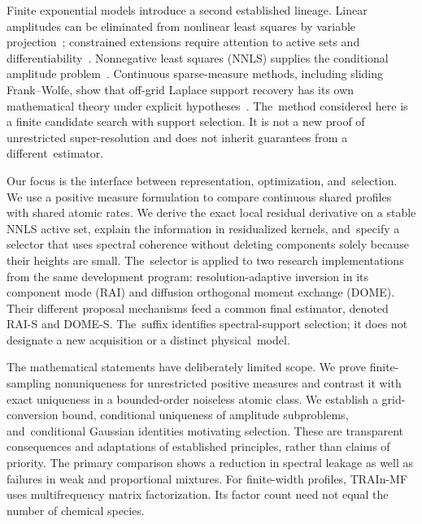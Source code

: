 \documentclass[mathematics,article,accept,moreauthors]{Definitions/mdpi}
\begin{document}
Finite exponential models introduce a second established lineage. Linear amplitudes can be eliminated from nonlinear least squares by variable projection~\cite{golub}; constrained extensions require attention to active sets and differentiability~\cite{shearer}. Nonnegative least squares (NNLS) supplies the conditional amplitude problem~\cite{lawson}. Continuous sparse-measure methods, including sliding Frank--Wolfe, show that off-grid Laplace support recovery has its own mathematical theory under explicit hypotheses~\cite{denoyelle}. The~method considered here is a finite candidate search with support selection. It is not a new proof of unrestricted super-resolution and does not inherit guarantees from a different~estimator.

Our focus is the interface between representation, optimization, and~selection. We use a positive measure formulation to compare continuous shared profiles with shared atomic rates. We derive the exact local residual derivative on a stable NNLS active set, explain the information in residualized kernels, and~specify a selector that uses spectral coherence without deleting components solely because their heights are small. The~selector is applied to two research implementations from the same development program: resolution-adaptive inversion in its component mode (RAI) and diffusion orthogonal moment exchange (DOME). Their different proposal mechanisms feed a common final estimator, denoted RAI-S and DOME-S. The~suffix identifies spectral-support selection; it does not designate a new acquisition or a distinct physical~model.

The mathematical statements have deliberately limited scope. We prove finite-sampling nonuniqueness for unrestricted positive measures and contrast it with exact uniqueness in a bounded-order noiseless atomic class. We establish a grid-conversion bound, conditional uniqueness of amplitude subproblems, and~conditional Gaussian identities motivating selection. These are transparent consequences and adaptations of established principles, rather than claims of priority. The primary comparison shows a reduction in spectral leakage as well as failures in weak and proportional mixtures. For finite-width profiles, TRAIn-MF uses multifrequency matrix factorization. Its factor count need not equal the number of chemical species.
\end{document}
